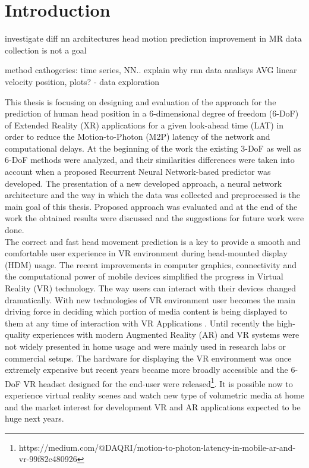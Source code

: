 \chapter{Introduction}
\label{sec:intro}
investigate diff nn architectures head motion prediction improvement in MR 
data collection is not a goal

method cathogeries: time series, NN.. 
explain why rnn 
data analisys AVG linear velocity position, plots? -  data exploration

This thesis is focusing on designing and evaluation of the approach for the prediction of human head position in a 6-dimensional degree of freedom (6-DoF) of Extended Reality (XR) applications for a given look-ahead time (LAT) in order to reduce the Motion-to-Photon (M2P) latency of the network and computational delays. At the beginning of the work the existing 3-DoF as well as 6-DoF methods were analyzed, and their similarities differences were taken into account when a proposed Recurrent Neural Network-based predictor was developed. The presentation of a new developed approach, a neural network architecture and the way in which the data was collected and preprocessed is the main goal of this thesis. Proposed approach was evaluated and at the end of the work the obtained results were discussed and the suggestions for future work were done.\\
The correct and fast head movement prediction is a key to provide a smooth and comfortable user experience in VR environment during head-mounted display (HDM) usage. The recent improvements in computer graphics, connectivity and the computational power of mobile devices simplified the progress in Virtual Reality (VR) technology. The way users can interact with their devices changed dramatically. With new technologies of VR environment user becomes the main driving force in deciding which portion of media content is being displayed to them at any time of interaction with VR Applications \cite{new_challenge}. Until recently the high-quality experiences with modern Augmented Reality (AR) and VR systems were not widely presented in home usage and were mainly used in research labs or commercial setups. The hardware for displaying the VR environment was once extremely expensive but recent years became more broadly accessible and the 6-DoF VR headset designed for the end-user were released\footnote{https://medium.com/@DAQRI/motion-to-photon-latency-in-mobile-ar-and-vr-99f82c480926}. It is possible now to experience virtual reality scenes and watch new type of volumetric media at home and the market interest for development VR and AR applications expected to be huge next years.\\

